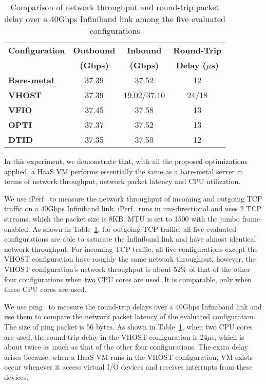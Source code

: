 
\begin{table}
\renewcommand{\arraystretch}{1.2}
\small
\begin{center}
\begin{tabular}{|l|c|c|c|} \hline
{\bf Configuration} & {\bf Outbound} & {\bf Inbound} & {\bf Round-Trip} \\
                    & {\bf (Gbps)}   & {\bf (Gbps)}  & {\bf Delay ($\mu$s)} \\ \hline
{\bf Bare-metal} & 37.39 & 37.52 & 12 \\ \hline
{\bf VHOST}      & 37.39 & 19.02/37.10 & 24/18\\ \hline
{\bf VFIO}       & 37.45 & 37.58 & 13 \\ \hline
{\bf OPTI}       & 37.37 & 37.52 & 13 \\ \hline
{\bf DTID}       & 37.35 & 37.50 & 12 \\ \hline
\end{tabular}
\end{center}
\vspace{-0.1in}
\caption{Comparison of network throughput and round-trip
packet delay over a 40Gbps Infiniband link among the five
evaluated configurations}
\label{tab:network_performance}
\vspace{-0.1in}
\end{table}

In this experiment, we demonstrate that, with all the proposed
optimizations applied, a HaaS VM performs essentially the same
as a bare-metal server in terms of network throughput, network
packet latency and CPU utilization.

We use iPerf~\cite{iperf} to measure the network throughput of
incoming and outgoing TCP traffic on a 40Gbps Infiniband link.
iPerf~\cite{iperf} runs in uni-directional and uses 2 TCP
streams, which the packet size is 8KB. MTU is set to 1500 with
the jumbo frame enabled. As shown in
Table~\ref{tab:network_performance}, for outgoing TCP traffic,
all five evaluated configurations are able to saturate the
Infiniband link and have almost identical network throughput.
For incoming TCP traffic, all five configurations except the
VHOST configuration have roughly the same network throughput;
however, the VHOST configuration's network throughput is about
52\% of that of the other four configurations when two CPU
cores are used. It is comparable, only when three CPU cores
are used.

We use ping~\cite{ping} to measure the round-trip delays over
a 40Gbps Infiniband link and use them to compare the network
packet latency of the evaluated configuration. The size of
ping packet is 56 bytes. As shown in
Table~\ref{tab:network_performance}, when two CPU cores are
used, the round-trip delay in the VHOST configuration is
24$\mu$s, which is about twice as much as that of the other
four configurations. The extra delay arises because, when a
HaaS VM runs in the VHOST configuration, VM exists occur
whenever it access virtual I/O devices and receives interrupts
from these devices.

